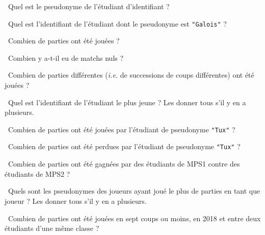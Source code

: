 \bigskip

\question\ Quel est le pseudonyme de l'étudiant d'identifiant  ?

\medskip

\question\ Quel est l'identifiant de l'étudiant dont le pseudonyme est \texttt{"Galois"} ?

\medskip

\question\ Combien de parties ont été jouées ? 

\medskip

\question\ Combien y a-t-il eu de matchs nuls ? 

\medskip

\question\ Combien de parties différentes (\emph{i.e.} de successions de coups différentes) ont été jouées ? 

\medskip

\question\ Quel est l'identifiant de l'étudiant le plus jeune ? Les donner tous s'il y en a plusieurs.  

\medskip

\question\ Combien de parties ont été jouées par l'étudiant de pseudonyme \texttt{"Tux"} ? 

\medskip

\question\ Combien de parties ont été perdues par l'étudiant de pseudonyme \texttt{"Tux"} ? 

\medskip

\question\ Combien de parties ont été gagnées par des étudiants de MPS1 contre des étudiants de MPS2 ?

\medskip

\question\ Quels sont les pseudonymes des joueurs ayant joué le plus de parties en tant que joueur  ? Les donner tous s'il y en a plusieurs.  

\medskip

\question\ Combien de parties ont été jouées en sept coups ou moins, en 2018 et entre deux étudiants d'une même classe ?
